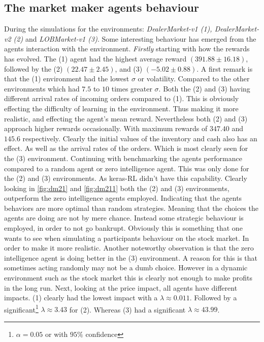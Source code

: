 \documentclass{kththesis}
\theoremstyle{definition}
\begin{document}
\subsection*{The market maker agents behaviour}
During the simulations for the environments: \textit{DealerMarket-v1 (1), \newline DealerMarket-v2 (2)} and \textit{LOBMarket-v1 (3)}. Some interesting behaviour has emerged from the agents interaction with the environment. \textit{Firstly} starting with how the rewards has evolved. The (1) agent had the highest average reward $(391.88 \pm 16.18)$, followed by the (2) $(22.47 \pm2.45)$, and (3) $(-5.02 \pm 0.88)$.  A first remark is that the (1) environment had the lowest $\sigma$ or volatility. Compared to the other environments which had $7.5$ to $10$ times greater $\sigma$. Both the (2) and (3) having different arrival rates of incoming orders compared to (1). This is obviously effecting the difficulty of learning in the environment. Thus making it more realistic, and effecting the agent's mean reward. Nevertheless both (2) and (3) approach higher rewards occasionally. With maximum rewards of $347.40$ and  $145.6$ respectively.  Clearly the initial values of the inventory and cash also has an effect. As well as the arrival rates of the orders. Which is most clearly seen for the (3) environment. 
\newline
\newline
Continuing with benchmarking the agents performance compared to a random agent or zero intelligence agent. This was only done for the (2) and (3) environments. As keras-RL didn't have this capability. Clearly looking in \autoref{fig:dm21} and \autoref{fig:dm211} both the (2) and (3) environments, outperform the zero intelligence agents employed. Indicating that the agents behaviors are more optimal than random strategies. Meaning that the choices the agents are doing are not by mere chance. Instead some strategic behaviour is employed, in order to not go bankrupt. Obviously this is something that one wants to see when simulating a participants behaviour on the stock market. In order to make it more realistic. Another noteworthy observation is that the zero intelligence agent is doing better in the (3) environment.
\newline
\newline
 A reason for this is that sometimes acting randomly may not be a dumb choice. However in a dynamic environment such as the stock market this is clearly not enough to make profits in the long run. Next, looking at the price impact, all agents have different impacts. (1) clearly had the lowest impact with a $\lambda \approx 0.011$. Followed by a significant\footnote{$\alpha = 0.05$ or with $95\%$ confidence} $\lambda \approx 3.43$ for (2). Whereas (3) had a significant $\lambda \approx 43.99$. 
 
\end{document}
